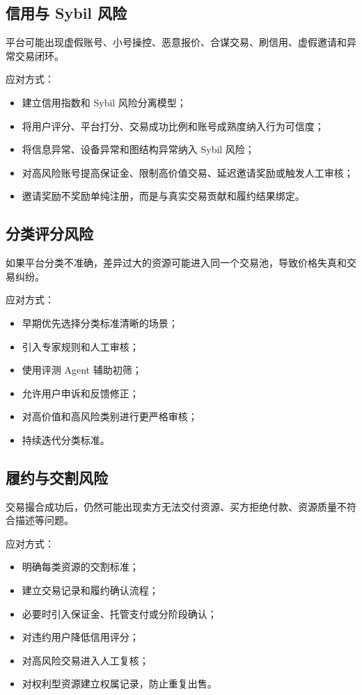 \documentclass[UTF8,a4paper,12pt]{ctexart}
\begin{document}
\subsection{信用与 Sybil 风险}

平台可能出现虚假账号、小号操控、恶意报价、合谋交易、刷信用、虚假邀请和异常交易闭环。

应对方式：

\begin{itemize}
    \item 建立信用指数和 Sybil 风险分离模型；
    \item 将用户评分、平台打分、交易成功比例和账号成熟度纳入行为可信度；
    \item 将信息异常、设备异常和图结构异常纳入 Sybil 风险；
    \item 对高风险账号提高保证金、限制高价值交易、延迟邀请奖励或触发人工审核；
    \item 邀请奖励不奖励单纯注册，而是与真实交易贡献和履约结果绑定。
\end{itemize}

\subsection{分类评分风险}

如果平台分类不准确，差异过大的资源可能进入同一个交易池，导致价格失真和交易纠纷。

应对方式：

\begin{itemize}
    \item 早期优先选择分类标准清晰的场景；
    \item 引入专家规则和人工审核；
    \item 使用评测 Agent 辅助初筛；
    \item 允许用户申诉和反馈修正；
    \item 对高价值和高风险类别进行更严格审核；
    \item 持续迭代分类标准。
\end{itemize}

\subsection{履约与交割风险}

交易撮合成功后，仍然可能出现卖方无法交付资源、买方拒绝付款、资源质量不符合描述等问题。

应对方式：

\begin{itemize}
    \item 明确每类资源的交割标准；
    \item 建立交易记录和履约确认流程；
    \item 必要时引入保证金、托管支付或分阶段确认；
    \item 对违约用户降低信用评分；
    \item 对高风险交易进入人工复核；
    \item 对权利型资源建立权属记录，防止重复出售。
\end{itemize}
\end{document}
